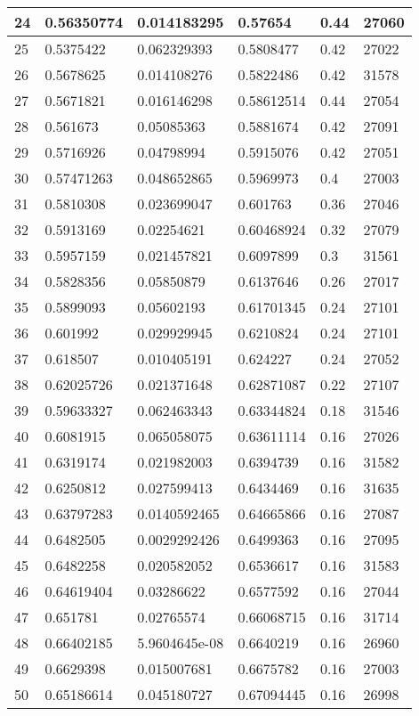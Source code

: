 \begin{longtable}{|l|l|l|l|l|l|}
24 & 0.56350774 & 0.014183295 & 0.57654 & 0.44 & 27060 \\ \hline 
25 & 0.5375422 & 0.062329393 & 0.5808477 & 0.42 & 27022 \\ \hline 
26 & 0.5678625 & 0.014108276 & 0.5822486 & 0.42 & 31578 \\ \hline 
27 & 0.5671821 & 0.016146298 & 0.58612514 & 0.44 & 27054 \\ \hline 
28 & 0.561673 & 0.05085363 & 0.5881674 & 0.42 & 27091 \\ \hline 
29 & 0.5716926 & 0.04798994 & 0.5915076 & 0.42 & 27051 \\ \hline 
30 & 0.57471263 & 0.048652865 & 0.5969973 & 0.4 & 27003 \\ \hline 
31 & 0.5810308 & 0.023699047 & 0.601763 & 0.36 & 27046 \\ \hline 
32 & 0.5913169 & 0.02254621 & 0.60468924 & 0.32 & 27079 \\ \hline 
33 & 0.5957159 & 0.021457821 & 0.6097899 & 0.3 & 31561 \\ \hline 
34 & 0.5828356 & 0.05850879 & 0.6137646 & 0.26 & 27017 \\ \hline 
35 & 0.5899093 & 0.05602193 & 0.61701345 & 0.24 & 27101 \\ \hline 
36 & 0.601992 & 0.029929945 & 0.6210824 & 0.24 & 27101 \\ \hline 
37 & 0.618507 & 0.010405191 & 0.624227 & 0.24 & 27052 \\ \hline 
38 & 0.62025726 & 0.021371648 & 0.62871087 & 0.22 & 27107 \\ \hline 
39 & 0.59633327 & 0.062463343 & 0.63344824 & 0.18 & 31546 \\ \hline 
40 & 0.6081915 & 0.065058075 & 0.63611114 & 0.16 & 27026 \\ \hline 
41 & 0.6319174 & 0.021982003 & 0.6394739 & 0.16 & 31582 \\ \hline 
42 & 0.6250812 & 0.027599413 & 0.6434469 & 0.16 & 31635 \\ \hline 
43 & 0.63797283 & 0.0140592465 & 0.64665866 & 0.16 & 27087 \\ \hline 
44 & 0.6482505 & 0.0029292426 & 0.6499363 & 0.16 & 27095 \\ \hline 
45 & 0.6482258 & 0.020582052 & 0.6536617 & 0.16 & 31583 \\ \hline 
46 & 0.64619404 & 0.03286622 & 0.6577592 & 0.16 & 27044 \\ \hline 
47 & 0.651781 & 0.02765574 & 0.66068715 & 0.16 & 31714 \\ \hline 
48 & 0.66402185 & 5.9604645e-08 & 0.6640219 & 0.16 & 26960 \\ \hline 
49 & 0.6629398 & 0.015007681 & 0.6675782 & 0.16 & 27003 \\ \hline 
50 & 0.65186614 & 0.045180727 & 0.67094445 & 0.16 & 26998 \\ \hline 
\end{longtable}